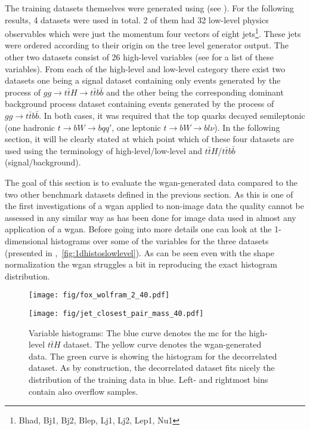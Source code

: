 \newcommand{\signal}{\(t \bar t H\)}
\newcommand{\background}{\(t \bar t b \bar b\)}
The training datasets themselves were generated using \pythiaDelphes{} (see ). For the following results, 4 datasets were used in total. 2 of them had 32 low-level physics observables which were just the momentum four vectors of eight jets\footnote{Bhad, Bj1, Bj2, Blep, Lj1, Lj2, Lep1, Nu1}. These jets were ordered according to their origin on the tree level generator output. The other two datasets consist of 26 high-level variables (see  for a list of these variables). From each of the high-level and low-level category there exist two datasets one being a signal dataset containing only events generated by the process of \(gg \rightarrow t\bar t H \rightarrow t \bar t b \bar b\) and the other being the corresponding dominant background process dataset containing events generated by the process of \(gg \rightarrow t\bar t b\bar b\). In both cases, it was required that the top quarks decayed semileptonic (one hadronic \(t \rightarrow bW \rightarrow b q q'\), one leptonic \(t \rightarrow bW \rightarrow b l \nu{}\)). In the following section, it will be clearly stated at which point which of these four datasets are used using the terminology of high-level/low-level and \signal{}/\background{} (signal/background).



The goal of this section is to evaluate the \gls{wgan}-generated data compared to the two other benchmark datasets defined in the previous section. As this is one of the first investigations of a \gls{wgan} applied to non-image data the quality cannot be assessed in any similar way as has been done for image data used in almost any application of a \gls{wgan}. Before going into more details one can look at the 1-dimensional histograms over some of the variables for the three datasets (presented in ,~\ref{fig:1dhistoslowlevel}). As can be seen even with the shape normalization the \gls{wgan} struggles a bit in reproducing the exact histogram distribution.


\begin{figure}[ht!]
\begin{minipage}{0.49\textwidth}
\texttt{[image: fig/fox\_wolfram\_2\_40.pdf]}
\end{minipage}
\begin{minipage}[r]{0.51\textwidth}
\texttt{[image: fig/jet\_closest\_pair\_mass\_40.pdf]}
\end{minipage}
\caption{Variable histograms: The blue curve denotes the \gls{mc} for the high-level \signal{} dataset. The yellow curve denotes the \gls{wgan}-generated data. The green curve is showing the histogram for the decorrelated dataset. As by construction, the decorrelated dataset fits nicely the distribution of the training data in blue. Left- and rightmost bins contain also overflow samples.}\label{fig:1dhistoshighlevel}
\end{figure}

